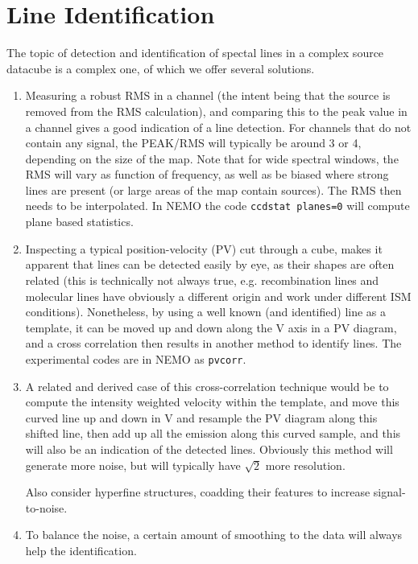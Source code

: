 \documentclass[preprint]{aastex} %
\begin{document}
\section{Line Identification}
\label{s:line}

The topic of detection and identification of spectal
lines in a complex source datacube is a complex one,
of which we offer several solutions. 

\begin{enumerate}

\item
Measuring a robust RMS in a channel (the intent being that the source is removed from the 
RMS calculation), and comparing this to the peak value in a channel gives a good 
indication of a line detection. For channels that do not contain any signal, 
the PEAK/RMS will typically be around 3 or 4, depending on the size of the map.
Note that for wide spectral windows, the RMS will vary as function of frequency,
as well as be biased where strong lines are present (or large areas of the map
contain sources). The RMS then needs to be interpolated. In NEMO the code
{\tt ccdstat planes=0} will compute plane based statistics.

\item
Inspecting a typical position-velocity (PV) cut through a cube, makes it apparent
that lines can be detected easily by eye, as their shapes are often related
(this is technically not always true, e.g. recombination lines and molecular lines have
obviously a different origin and work under different ISM conditions). Nonetheless,
by using a well known (and identified) line as a template, it can be moved up and down
along the V axis in a PV diagram, and a cross correlation then results in another method
to identify lines. The experimental codes are in NEMO as {\tt pvcorr}.


\item
A related and derived case of this
cross-correlation technique would be to compute the intensity
weighted velocity within the template, and move this curved line up and down in V and resample
the PV diagram along this shifted line, then add up all the emission along this curved
sample, and this will also be an indication of the detected lines.  Obviously this
method will generate more noise, but will typically have $\sqrt{2}$ more resolution.

Also consider hyperfine structures, coadding their features to increase signal-to-noise.

\item
To balance the noise, a certain amount of smoothing to the data will always help
the identification.


\end{enumerate}
\end{document}
